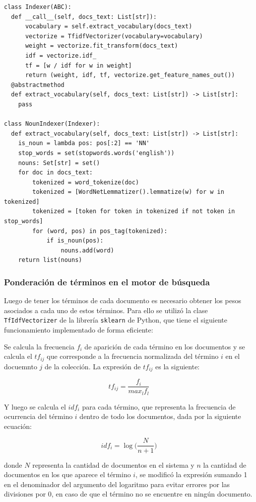 \begin{verbatim}
class Indexer(ABC):
  def __call__(self, docs_text: List[str]):
      vocabulary = self.extract_vocabulary(docs_text)
      vectorize = TfidfVectorizer(vocabulary=vocabulary)
      weight = vectorize.fit_transform(docs_text)
      idf = vectorize.idf_
      tf = [w / idf for w in weight]
      return (weight, idf, tf, vectorize.get_feature_names_out())
  @abstractmethod
  def extract_vocabulary(self, docs_text: List[str]) -> List[str]:
    pass

class NounIndexer(Indexer):
  def extract_vocabulary(self, docs_text: List[str]) -> List[str]:
    is_noun = lambda pos: pos[:2] == 'NN'
    stop_words = set(stopwords.words('english'))
    nouns: Set[str] = set()
    for doc in docs_text:
        tokenized = word_tokenize(doc)
        tokenized = [WordNetLemmatizer().lemmatize(w) for w in tokenized]
        tokenized = [token for token in tokenized if not token in stop_words]
        for (word, pos) in pos_tag(tokenized):
            if is_noun(pos):
                nouns.add(word)
    return list(nouns)
\end{verbatim}

\subsubsection{Ponderación de términos en el motor de búsqueda}

Luego de tener los términos de cada documento es necesario obtener los pesos asociados a cada uno de estos términos. Para ello se utilizó la clase \verb|TfIdfVectorizer| \cite{tf} \cite{tfidf} de la librería \verb|sklearn| de Python, que tiene el siguiente funcionamiento implementado de forma eficiente:

Se calcula la frecuencia $f_i$ de aparición de cada término en los documentos y se calcula el $tf_{ij}$ que corresponde a la frecuencia normalizada del término $i$ en el docuemnto $j$ de la colección. La expresión de $tf_{ij}$ es la siguiente:

$$ tf_{ij} = \frac{f_i}{max_l f_l} $$

Y luego se calcula el $idf_i$ para cada término, que representa la frecuencia de ocurrencia del término $i$ dentro de todo los documentos, dada por la siguiente ecuación:

$$ idf_i = \log \bigg(\frac{N}{n + 1}\bigg) $$

donde $N$ representa la cantidad de documentos en el sistema y $n$ la cantidad de documentos en los que aparece el término $i$, se modificó la expresión sumando 1 en el denominador del argumento del logaritmo para evitar errores por las divisiones por 0, en caso de que el término no se encuentre en ningún documento.

